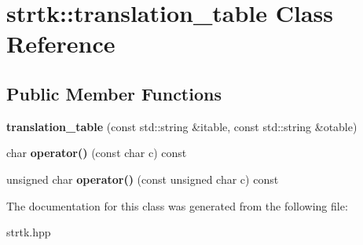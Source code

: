 \hypertarget{classstrtk_1_1translation__table}{\section{strtk\-:\-:translation\-\_\-table Class Reference}
\label{classstrtk_1_1translation__table}
}
\subsection*{Public Member Functions}
\begin{DoxyCompactItemize}
\item 
\hypertarget{classstrtk_1_1translation__table_a38273f168717d2911b9acef0b02773d9}{{\bfseries translation\-\_\-table} (const std\-::string \&itable, const std\-::string \&otable)}\label{classstrtk_1_1translation__table_a38273f168717d2911b9acef0b02773d9}

\item 
\hypertarget{classstrtk_1_1translation__table_a06d25cf30174d4a3108fc0a2b21e74e7}{char {\bfseries operator()} (const char c) const }\label{classstrtk_1_1translation__table_a06d25cf30174d4a3108fc0a2b21e74e7}

\item 
\hypertarget{classstrtk_1_1translation__table_a4a5a6cfd183ded22e57a1dcfdfc88d4e}{unsigned char {\bfseries operator()} (const unsigned char c) const }\label{classstrtk_1_1translation__table_a4a5a6cfd183ded22e57a1dcfdfc88d4e}

\end{DoxyCompactItemize}


The documentation for this class was generated from the following file\-:\begin{DoxyCompactItemize}
\item 
strtk.\-hpp\end{DoxyCompactItemize}
